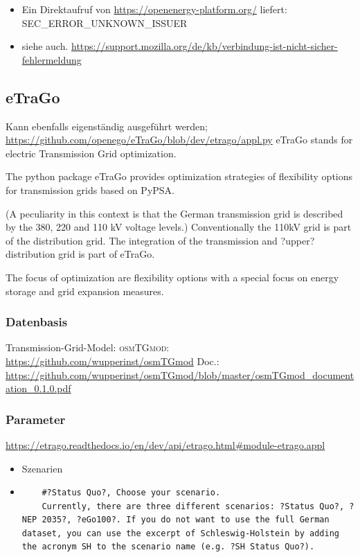 \documentclass[
a4paper,     %
12pt         %
]{scrartcl}  %
\begin{document}
\begin{itemize}
\begin{itemize}
\begin{lstlisting}[language=bash]
		
		\end{lstlisting}
		
		\item Ein Direktaufruf von \url{https://openenergy-platform.org/} liefert:\\ \textsc{SEC\_ERROR\_UNKNOWN\_ISSUER}\\
		\item siehe auch. \url{https://support.mozilla.org/de/kb/verbindung-ist-nicht-sicher-fehlermeldung}
	\end{itemize}
\end{itemize}

\subsection{eTraGo}
Kann ebenfalls eigenständig ausgeführt werden;
\url{https://github.com/openego/eTraGo/blob/dev/etrago/appl.py}
eTraGo stands for electric Transmission Grid optimization.

The python package eTraGo provides optimization strategies of flexibility options for transmission grids based on PyPSA.

(A peculiarity in this context is that the German transmission grid is described by the 380, 220 and 110 kV voltage levels.)
Conventionally the 110kV grid is part of the distribution grid. The integration of the transmission and ?upper? distribution grid is part of eTraGo.

The focus of optimization are flexibility options with a special focus on energy storage and grid expansion measures.
\subsubsection{Datenbasis}
Transmission-Grid-Model: \textsc{osmTGmod}:
\url{https://github.com/wupperinst/osmTGmod}
Doc.: \url{https://github.com/wupperinst/osmTGmod/blob/master/osmTGmod_documentation_0.1.0.pdf}

\subsubsection{Parameter}
\url{https://etrago.readthedocs.io/en/dev/api/etrago.html#module-etrago.appl}
\begin{itemize}
	\item Szenarien
	\item[] \begin{lstlisting}
	#?Status Quo?, Choose your scenario.
	Currently, there are three different scenarios: ?Status Quo?, ?NEP 2035?, ?eGo100?. If you do not want to use the full German dataset, you can use the excerpt of Schleswig-Holstein by adding the acronym SH to the scenario name (e.g. ?SH Status Quo?).
	\end{lstlisting}
\end{itemize}
\end{document}
